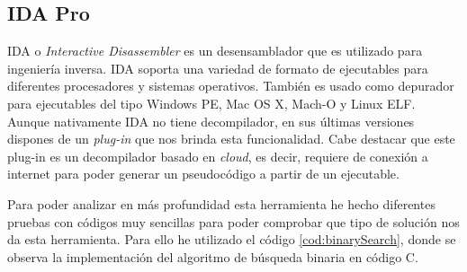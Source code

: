 \subsection{IDA Pro}
\label{subsec:IDA_pro}


IDA o \textit{Interactive Disassembler} es un desensamblador que es utilizado para
ingeniería inversa. IDA soporta una variedad de formato de ejecutables para diferentes
procesadores y sistemas operativos. También es usado como depurador para ejecutables
del tipo Windows PE, Mac OS X, Mach-O y Linux ELF\cite{IDAPro_Wikipedia}. Aunque
nativamente IDA no tiene decompilador, en sus últimas versiones dispones de un \textit{plug-in}
que nos brinda esta funcionalidad. Cabe destacar que este plug-in es un decompilador
basado en \textit{cloud}, es decir, requiere de conexión a internet para poder generar
un pseudocódigo a partir de un ejecutable.

Para poder analizar en más profundidad esta herramienta he hecho diferentes pruebas
con códigos muy sencillas para poder comprobar que tipo de solución nos da esta
herramienta. Para ello he utilizado el código \ref{cod:binarySearch}, donde se observa
la implementación del algoritmo de búsqueda binaria en código C.


